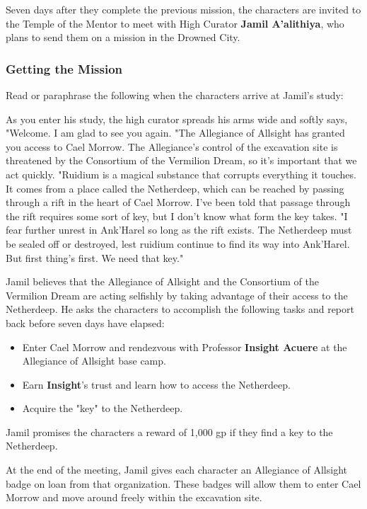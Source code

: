 \documentclass[a4paper, 11pt, bg=full, twocolumn, nooutline]{dndbook}
\begin{document}
Seven days after they complete the previous mission, the characters are invited to the Temple of the Mentor to meet with High Curator \textbf{Jamil A'alithiya}, who plans to send them on a mission in the Drowned City.

\subsubsection{Getting the Mission}

Read or paraphrase the following when the characters arrive at Jamil's study:

\begin{DndReadAloud}
As you enter his study, the high curator spreads his arms wide and softly says, "Welcome. I am glad to see you again.
"The Allegiance of Allsight has granted you access to Cael Morrow. The Allegiance's control of the excavation site is threatened by the Consortium of the Vermilion Dream, so it's important that we act quickly.
"Ruidium is a magical substance that corrupts everything it touches. It comes from a place called the Netherdeep, which can be reached by passing through a rift in the heart of Cael Morrow. I've been told that passage through the rift requires some sort of key, but I don't know what form the key takes.
"I fear further unrest in Ank'Harel so long as the rift exists. The Netherdeep must be sealed off or destroyed, lest ruidium continue to find its way into Ank'Harel. But first thing's first. We need that key."
\end{DndReadAloud}

Jamil believes that the Allegiance of Allsight and the Consortium of the Vermilion Dream are acting selfishly by taking advantage of their access to the Netherdeep. He asks the characters to accomplish the following tasks and report back before seven days have elapsed:

\begin{itemize}
\item Enter Cael Morrow and rendezvous with Professor \textbf{Insight Acuere} at the Allegiance of Allsight base camp.
\item Earn \textbf{Insight}'s trust and learn how to access the Netherdeep.
\item Acquire the "key" to the Netherdeep.
\end{itemize}

Jamil promises the characters a reward of 1,000 gp if they find a key to the Netherdeep.

At the end of the meeting, Jamil gives each character an Allegiance of Allsight badge on loan from that organization. These badges will allow them to enter Cael Morrow and move around freely within the excavation site.
\end{document}
